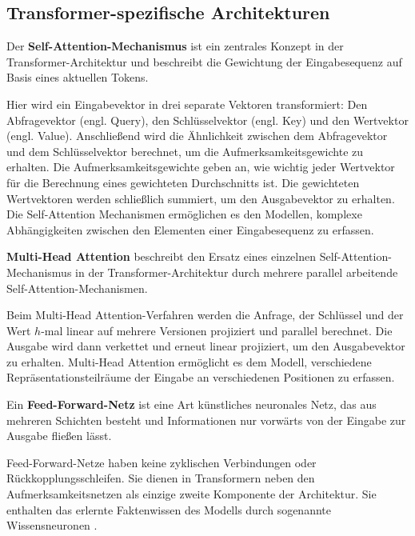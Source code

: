 \subsection{Transformer-spezifische Architekturen}

\begin{definition}\label{def:self-attention-mechanismus}
    Der \textbf{Self-Attention-Mechanismus} ist ein zentrales Konzept in der Transformer-Architektur und beschreibt die Gewichtung der Eingabesequenz auf Basis eines aktuellen Tokens.
\end{definition}
\enlargethispage{0.5\baselineskip}
Hier wird ein Eingabevektor in drei separate Vektoren transformiert:
Den Abfragevektor (engl. Query), den Schlüsselvektor (engl. Key) und den Wertvektor (engl. Value).
Anschließend wird die Ähnlichkeit zwischen dem Abfragevektor und dem Schlüsselvektor berechnet,
um die Aufmerksamkeitsgewichte zu erhalten.
Die Aufmerksamkeitsgewichte geben an, wie wichtig jeder Wertvektor für die Berechnung eines gewichteten
Durchschnitts ist. Die gewichteten Wertvektoren werden schließlich summiert, um den Ausgabevektor zu erhalten.
Die Self-Attention Mechanismen ermöglichen es den Modellen, komplexe Abhängigkeiten zwischen den Elementen einer Eingabesequenz zu erfassen.\\

\begin{definition}\label{def:multi-head-attention}
    \textbf{Multi-Head Attention} beschreibt den Ersatz eines einzelnen Self-Attention-Mechanismus in der Transformer-Architektur durch mehrere parallel arbeitende Self-Attention-Mechanismen.
\end{definition}
Beim Multi-Head Attention-Verfahren werden die Anfrage, der Schlüssel und der Wert $h$-mal linear auf mehrere Versionen projiziert und parallel berechnet. Die Ausgabe wird dann verkettet und erneut linear projiziert, um den Ausgabevektor zu erhalten. Multi-Head Attention ermöglicht es dem Modell, verschiedene Repräsentationsteilräume der Eingabe an verschiedenen Positionen zu erfassen.

\begin{definition}\label{def:feed-forward-netz}
    Ein \textbf{Feed-Forward-Netz} ist eine Art künstliches neuronales Netz, das aus mehreren Schichten besteht und Informationen nur vorwärts von der Eingabe zur Ausgabe fließen lässt.
\end{definition}
Feed-Forward-Netze haben keine zyklischen Verbindungen oder Rückkopplungsschleifen.
Sie dienen in Transformern neben den Aufmerksamkeitsnetzen als einzige zweite Komponente der Architektur.
Sie enthalten das erlernte Faktenwissen des Modells durch sogenannte Wissensneuronen \citep{knowledge_neurons}.\\

